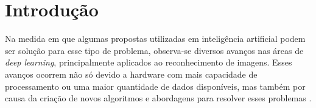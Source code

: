 \newpage
\section{Introdução}
Na medida em que algumas propostas utilizadas em inteligência artificial podem ser solução para esse tipo de problema, observa-se diversos avanços nas áreas de \textit{deep learning}, principalmente aplicados ao reconhecimento de imagens. Esses avanços ocorrem não só devido a hardware com mais capacidade de processamento ou uma maior quantidade de dados disponíveis, mas também por causa da criação de novos algoritmos e abordagens para resolver esses problemas \cite{Szegedy2015GoingConvolutions}. 
